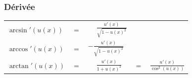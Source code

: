 \documentclass[a4paper]{article}
\begin{document}
			\subsubsection*{Dérivée}

				\begin{tabular}{lclcl}
					$\arcsin'(u(x))$ & $=$ & $\phantom{-}\frac{u'(x)}{\sqrt{1 - u(x)^2}}$ & & \\
					$\arccos'(u(x))$ & $=$ & $-\frac{u'(x)}{\sqrt{1 - u(x)^2}}$ & & \\
					$\arctan'(u(x))$ & $=$ & $\phantom{-}\frac{u'(x)}{1 + u(x)^2}$ & $ = $ & $\frac{u'(x)}{\cos^2(u(x))}$ \\
				\end{tabular}

\newpage
			\vspace*{-1cm}
			\begin{center}
			\end{center}
\end{document}
